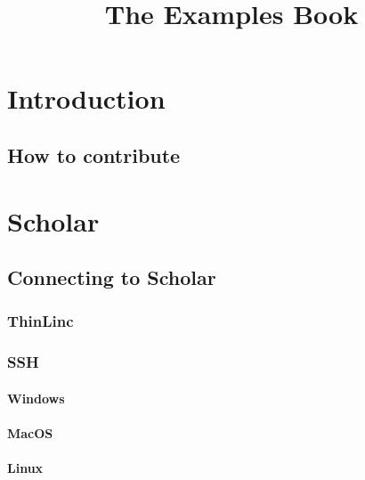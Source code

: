\documentclass[
]{book}
\title{The Examples Book}
\author{}
\date{\vspace{-2.5em}}
\begin{document}
\maketitle

{
\setcounter{tocdepth}{1}
\tableofcontents
}
\hypertarget{introduction}{%
\chapter{Introduction}\label{introduction}}

\hypertarget{how-to-contribute}{%
\section{How to contribute}\label{how-to-contribute}}

\hypertarget{scholar}{%
\chapter{Scholar}\label{scholar}}

\hypertarget{connecting-to-scholar}{%
\section{Connecting to Scholar}\label{connecting-to-scholar}}

\hypertarget{connecting-with-thinlinc}{%
\subsection{ThinLinc}\label{connecting-with-thinlinc}}

\hypertarget{connecting-with-ssh}{%
\subsection{SSH}\label{connecting-with-ssh}}

\hypertarget{connecting-to-scholar-ssh-windows}{%
\subsubsection{Windows}\label{connecting-to-scholar-ssh-windows}}

\hypertarget{connecting-to-scholar-ssh-macos}{%
\subsubsection{MacOS}\label{connecting-to-scholar-ssh-macos}}

\hypertarget{connecting-to-scholar-ssh-linux}{%
\subsubsection{Linux}\label{connecting-to-scholar-ssh-linux}}
\end{document}
